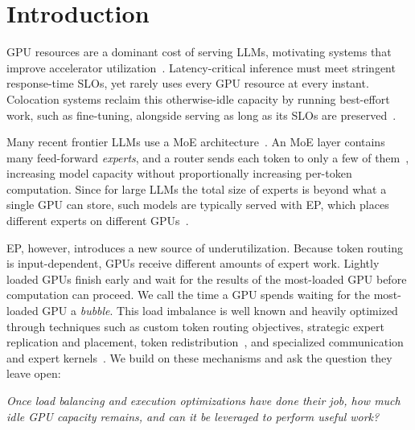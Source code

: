 \section{Introduction}
\label{sec:intro}

\acresetall

GPU resources are a dominant cost of serving \acp{LLM}, motivating systems that improve accelerator utilization~\cite{orca,vllm,sarathi,distserve,splitwise,muxserve,aegaeon}. Latency-critical inference must meet stringent response-time \acp{SLO}, yet rarely uses every GPU resource at every instant.
Colocation systems reclaim this otherwise-idle capacity by running best-effort work, such as fine-tuning, alongside serving as long as its \acp{SLO} are preserved~\cite{orion,llmstation,harli}.

Many recent frontier \acp{LLM} use a \ac{MoE} architecture~\cite{deepseekv3,deepseekv4,qwen3,kimik2,gptoss,gemini15,gemini25}. An \ac{MoE} layer contains many feed-forward \emph{experts}, and a router sends each token to only a few of them~\cite{switch}, increasing model capacity without proportionally increasing per-token computation.
Since for large \acp{LLM} the total size of experts is beyond what a single GPU can store, such models are typically served with \ac{EP}, which places different experts on different GPUs~\cite{deepseekv3,vllm-ep-rfc}.



\ac{EP}, however, introduces a new source of underutilization.
Because token routing is input-dependent, GPUs receive different amounts of expert work.
Lightly loaded GPUs finish early and wait for the results of the most-loaded GPU before computation can proceed.
We call the time a GPU spends waiting for the most-loaded GPU a \emph{bubble}.
This load imbalance is well known and heavily optimized through techniques such as custom token routing objectives, strategic expert replication and placement, token redistribution~\cite{switch,gshard,expertchoice,deepseekv3,fastermoe,eplb,lplb,waterfill,harmoeny}, and specialized communication and expert kernels~\cite{deepep,pplxkernels,megablocks}.
We build on these mechanisms and ask the question they leave open:
\begin{highlight}
  \emph{Once load balancing and execution optimizations have done
  their job, how much idle GPU capacity remains, and can it be leveraged to perform useful work?}
\end{highlight}

